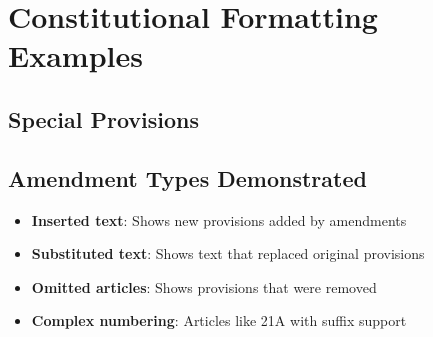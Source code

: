 \documentclass[showamendments]{soi}
\begin{document}
\section*{Constitutional Formatting Examples}

\subsection*{Special Provisions}



\subsection*{Amendment Types Demonstrated}
\begin{itemize}
\item \textbf{Inserted text}: Shows new provisions added by amendments
\item \textbf{Substituted text}: Shows text that replaced original provisions  
\item \textbf{Omitted articles}: Shows provisions that were removed
\item \textbf{Complex numbering}: Articles like 21A with suffix support
\end{itemize}
\end{document}
